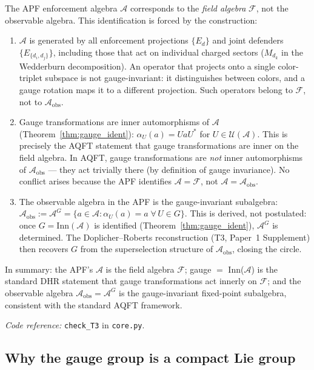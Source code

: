 \documentclass[11pt,a4paper]{article}
\theoremstyle{definition}
\newcommand{\coderef}[2]{\smallskip\noindent\textit{Code reference:} \texttt{#1} in \texttt{#2}.}
\begin{document}
The APF enforcement algebra $\mathcal{A}$ corresponds to the
\emph{field algebra} $\mathcal{F}$, not the observable algebra.
This identification is forced by the construction:
\begin{enumerate}[label=(\alph*),nosep]
  \item $\mathcal{A}$ is generated by all enforcement projections
  $\{E_d\}$ and joint defenders $\{E_{\{d_i,d_j\}}\}$, including those
  that act on individual charged sectors ($M_{d_k}$ in the Wedderburn
  decomposition).  An operator that projects onto a single color-triplet
  subspace is not gauge-invariant: it distinguishes between colors, and
  a gauge rotation maps it to a different projection.  Such operators
  belong to $\mathcal{F}$, not to $\mathcal{A}_{\mathrm{obs}}$.
  \item Gauge transformations are inner automorphisms of $\mathcal{A}$
  (Theorem~\ref{thm:gauge_ident}):
  $\alpha_U(a) = UaU^*$ for $U \in \mathcal{U}(\mathcal{A})$.  This
  is precisely the AQFT statement that gauge transformations are inner
  on the field algebra.  In AQFT, gauge transformations are
  \emph{not} inner automorphisms of $\mathcal{A}_{\mathrm{obs}}$ ---
  they act trivially there (by definition of gauge invariance).  No
  conflict arises because the APF identifies
  $\mathcal{A} = \mathcal{F}$, not
  $\mathcal{A} = \mathcal{A}_{\mathrm{obs}}$.
  \item The observable algebra in the APF is the gauge-invariant
  subalgebra: $\mathcal{A}_{\mathrm{obs}} := \mathcal{A}^G =
  \{a \in \mathcal{A} : \alpha_U(a) = a \;\forall\, U \in G\}$.
  This is derived, not postulated: once $G = \mathrm{Inn}(\mathcal{A})$
  is identified (Theorem~\ref{thm:gauge_ident}),
  $\mathcal{A}^G$ is determined.  The
  Doplicher--Roberts reconstruction (T3, Paper~1 Supplement) then
  recovers $G$ from the superselection structure of
  $\mathcal{A}_{\mathrm{obs}}$, closing the circle.
\end{enumerate}
In summary: the APF's $\mathcal{A}$ is the field algebra
$\mathcal{F}$; gauge $=$ Inn($\mathcal{A}$) is the standard
DHR statement that gauge transformations act innerly on
$\mathcal{F}$; and the observable algebra
$\mathcal{A}_{\mathrm{obs}} = \mathcal{A}^G$ is the
gauge-invariant fixed-point subalgebra, consistent with the
standard AQFT framework.

\coderef{check\_T3}{core.py}


\subsection{Why the gauge group is a compact Lie group}
\label{sec:compact_lie}
\end{document}
